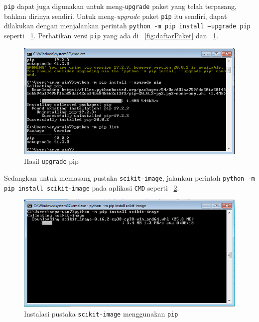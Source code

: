 \texttt{pip} dapat juga digunakan untuk meng-\texttt{upgrade} paket yang telah terpasang, bahkan dirinya sendiri. Untuk meng-\textit{upgrade} paket \texttt{pip} itu sendiri, dapat dilakukan dengan menjalankan perintah \texttt{python -m pip install --upgrade pip} seperti \figurename~\ref{fig:pipUpgrade}. Perhatikan versi \texttt{pip} yang ada di \figurename~\ref{fig:daftarPaket} dan \figurename~\ref{fig:pipUpgrade}.
 
\begin{figure}
  \begin{center}
    \includegraphics[scale=.5]{pics/pipList2.png}
    \caption{Hasil \texttt{upgrade} pip}
    \label{fig:pipUpgrade}
  \end{center}
\end{figure}

Sedangkan untuk memasang pustaka \texttt{scikit-image}, jalankan perintah \texttt{python -m pip install scikit-image} pada aplikasi \texttt{CMD} seperti \figurename~\ref{fig:installSkimage}.

\begin{figure}[h!]
  \begin{center}
    \includegraphics[scale=.5]{pics/installScikit-Image.png}
    \caption{Instalasi pustaka \texttt{scikit-image} menggunakan \texttt{pip}}
    \label{fig:installSkimage}
  \end{center}
\end{figure}

